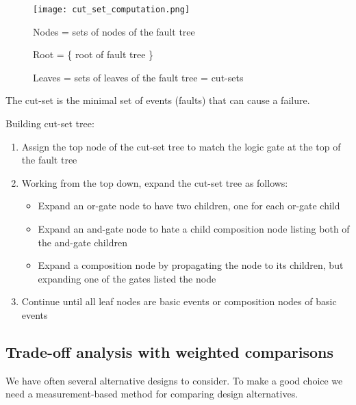 \begin{figure}[!ht]
    \begin{minipage}{\linewidth}
        \begin{minipage}{0.45\linewidth}
            \centering
            \texttt{[image: cut\_set\_computation.png]}
        \end{minipage}
        \begin{minipage}{0.45\linewidth}
            Nodes = sets of nodes of the fault tree

            Root = \{ root of fault tree \}

            Leaves = sets of leaves of the fault tree
            = cut-sets
        \end{minipage}
    \end{minipage}
\end{figure}

The cut-set is the minimal set of events (faults) that can cause a failure. \newline

Building cut-set tree:

\begin{enumerate}
    \item Assign the top node of the cut-set tree to match the logic gate at the top of the fault
tree
    \item Working from the top down, expand the cut-set tree as follows:
    \begin{itemize}
        \item Expand an or-gate node to have two children, one for each or-gate child
        \item Expand an and-gate node to hate a child composition node listing both of the and-gate children
        \item Expand a composition node by propagating the node to its children, but expanding one of the gates listed the node
    \end{itemize}
    \item Continue until all leaf nodes are basic events or composition nodes of basic events
\end{enumerate}

\subsection{Trade-off analysis with weighted comparisons}

We have often several alternative designs to consider. To make a good choice we need a
measurement-based method for comparing design alternatives. \newline

